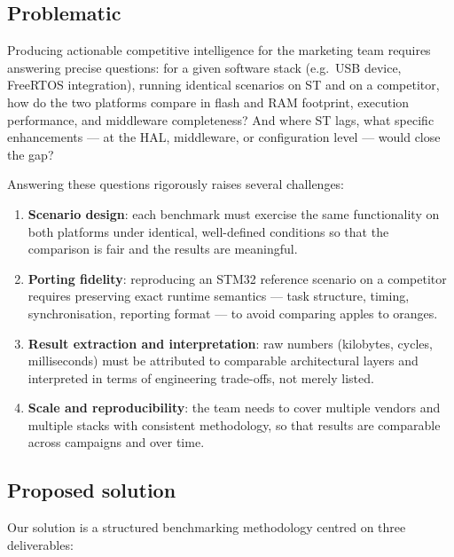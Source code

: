 \subsection{Problematic}
\label{sec:problematic}

Producing actionable competitive intelligence for the marketing team requires answering
precise questions: for a given software stack (e.g.\ USB device, FreeRTOS integration),
running identical scenarios on ST and on a competitor, how do the two platforms compare in
flash and RAM footprint, execution performance, and middleware completeness? And where ST
lags, what specific enhancements --- at the HAL, middleware, or configuration level ---
would close the gap?

Answering these questions rigorously raises several challenges:

\begin{enumerate}
\item \textbf{Scenario design}: each benchmark must exercise the same functionality on both
platforms under identical, well-defined conditions so that the comparison is fair and the
results are meaningful.
\item \textbf{Porting fidelity}: reproducing an STM32 reference scenario on a competitor
requires preserving exact runtime semantics --- task structure, timing, synchronisation,
reporting format --- to avoid comparing apples to oranges.
\item \textbf{Result extraction and interpretation}: raw numbers (kilobytes, cycles,
milliseconds) must be attributed to comparable architectural layers and interpreted in
terms of engineering trade-offs, not merely listed.
\item \textbf{Scale and reproducibility}: the team needs to cover multiple vendors and
multiple stacks with consistent methodology, so that results are comparable across
campaigns and over time.
\end{enumerate}

\subsection{Proposed solution}
\label{sec:proposed-solution}

Our solution is a structured benchmarking methodology centred on three deliverables:

